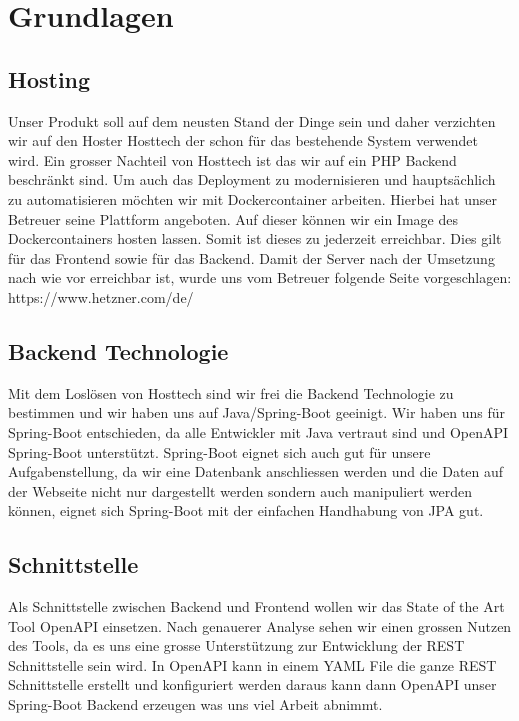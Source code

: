 \documentclass[../main.tex]{subfiles}
\begin{document}
	\section{Grundlagen}
	
	\subsection{Hosting}
	Unser Produkt soll auf dem neusten Stand der Dinge sein und daher verzichten wir auf den Hoster Hosttech der schon für das bestehende System verwendet wird. Ein grosser Nachteil von Hosttech ist das wir auf ein PHP Backend beschränkt sind. Um auch das Deployment zu modernisieren und hauptsächlich zu automatisieren möchten wir mit Dockercontainer arbeiten. Hierbei hat unser Betreuer seine Plattform angeboten. Auf dieser können wir ein Image des Dockercontainers hosten lassen. Somit ist dieses zu jederzeit erreichbar. Dies gilt für das Frontend sowie für das Backend.
	Damit der Server nach der Umsetzung nach wie vor erreichbar ist, wurde uns vom Betreuer folgende Seite vorgeschlagen: https://www.hetzner.com/de/
	
	\subsection{Backend Technologie}
	Mit dem Loslösen von Hosttech sind wir frei die Backend Technologie zu bestimmen und wir haben uns auf Java/Spring-Boot geeinigt. Wir haben uns für Spring-Boot entschieden, da alle Entwickler mit Java vertraut sind und OpenAPI Spring-Boot unterstützt. Spring-Boot eignet sich auch gut für unsere Aufgabenstellung, da wir eine Datenbank anschliessen werden und die Daten auf der Webseite nicht nur dargestellt werden sondern auch manipuliert werden können, eignet sich Spring-Boot mit der einfachen Handhabung von JPA gut.
	
	\subsection{Schnittstelle}
	Als Schnittstelle zwischen Backend und Frontend wollen wir das State of the Art Tool OpenAPI einsetzen. Nach genauerer Analyse sehen wir einen grossen Nutzen des Tools, da es uns eine grosse Unterstützung zur Entwicklung der REST Schnittstelle sein wird. In OpenAPI kann in einem YAML File die ganze REST Schnittstelle erstellt und konfiguriert werden daraus kann dann OpenAPI unser Spring-Boot Backend erzeugen was uns viel Arbeit abnimmt.
	
\end{document}

